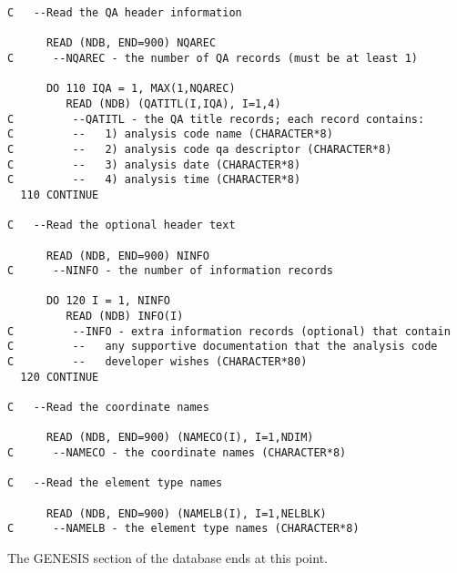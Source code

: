 \begin{verbatim}
C   --Read the QA header information

      READ (NDB, END=900) NQAREC
C      --NQAREC - the number of QA records (must be at least 1)

      DO 110 IQA = 1, MAX(1,NQAREC)
         READ (NDB) (QATITL(I,IQA), I=1,4)
C         --QATITL - the QA title records; each record contains:
C         --   1) analysis code name (CHARACTER*8)
C         --   2) analysis code qa descriptor (CHARACTER*8)
C         --   3) analysis date (CHARACTER*8)
C         --   4) analysis time (CHARACTER*8)
  110 CONTINUE

C   --Read the optional header text

      READ (NDB, END=900) NINFO
C      --NINFO - the number of information records

      DO 120 I = 1, NINFO
         READ (NDB) INFO(I)
C         --INFO - extra information records (optional) that contain
C         --   any supportive documentation that the analysis code
C         --   developer wishes (CHARACTER*80)
  120 CONTINUE

C   --Read the coordinate names

      READ (NDB, END=900) (NAMECO(I), I=1,NDIM)
C      --NAMECO - the coordinate names (CHARACTER*8)

C   --Read the element type names

      READ (NDB, END=900) (NAMELB(I), I=1,NELBLK)
C      --NAMELB - the element type names (CHARACTER*8)
\end{verbatim}

The GENESIS section of the database ends at this point. 

